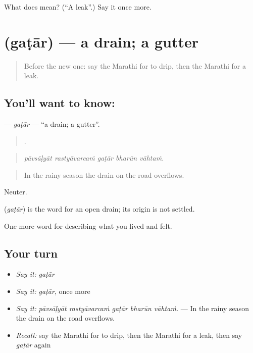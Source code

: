 \begin{tcolorbox}[breakable,colback=teal!4,colframe=teal!35!black,title={Before you move on}]
What does  mean? (\textquotedblleft{}A leak\textquotedblright{}.) Say it once more.
\end{tcolorbox}
\section[\texorpdfstring{\mr{गटार} (gaṭār)}{गटार (gaṭār)}]{ (gaṭār) — a drain; a gutter}

\label{lesson:MR-C520-gatar}



\begin{quote}
Before the new one: say the Marathi for to drip, then the Marathi for a leak.
\end{quote}

\subsection*{You'll want to know: }
\textbf{} — \emph{gaṭār} — \textquotedblleft{}a drain; a gutter\textquotedblright{}.

\begin{quote}
    .
\end{quote}

\begin{quote}
\emph{pāvsāḷyāt rastyāvarcaṁ gaṭār bharūn vāhtaṁ.}
\end{quote}

\begin{quote}
In the rainy season the drain on the road overflows.
\end{quote}

Neuter.

\begin{cousinweb}
\textbf{} (\emph{gaṭār}) is the word for an open drain; its origin is not settled.
\end{cousinweb}

\begin{grammarlens}[title={What you've built}]
One more word for describing what you lived and felt.
\end{grammarlens}

\subsection*{Your turn}
\begin{itemize}
\raggedright
  \item \emph{Say it:} \emph{gaṭār}
  \item \emph{Say it:} \emph{gaṭār}, once more
  \item \emph{Say it:} \emph{pāvsāḷyāt rastyāvarcaṁ gaṭār bharūn vāhtaṁ.} — In the rainy season the drain on the road overflows.
  \item \emph{Recall:} say the Marathi for to drip, then the Marathi for a leak, then say \emph{gaṭār} again
\end{itemize}


